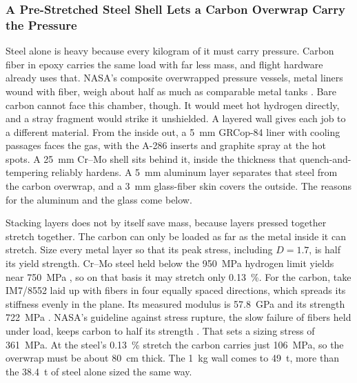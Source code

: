 \documentclass{article}
\begin{document}
\subsubsection{A Pre-Stretched Steel Shell Lets a Carbon Overwrap Carry the Pressure}\label{sec:carbon_overwrap}

Steel alone is heavy because every kilogram of it must carry pressure. Carbon fiber in epoxy carries the same load with far less mass, and flight hardware already uses that. NASA's composite overwrapped pressure vessels, metal liners wound with fiber, weigh about half as much as comparable metal tanks \cite{mclaughlan2011_copv_primer}. Bare carbon cannot face this chamber, though. It would meet hot hydrogen directly, and a stray fragment would strike it unshielded. A layered wall gives each job to a different material. From the inside out, a \SI{5}{\milli\meter} GRCop-84 liner with cooling passages faces the gas, with the A-286 inserts and graphite spray at the hot spots. A \SI{25}{\milli\meter} Cr--Mo shell sits behind it, inside the thickness that quench-and-tempering reliably hardens. A \SI{5}{\milli\meter} aluminum layer separates that steel from the carbon overwrap, and a \SI{3}{\milli\meter} glass-fiber skin covers the outside. The reasons for the aluminum and the glass come below.

Stacking layers does not by itself save mass, because layers pressed together stretch together. The carbon can only be loaded as far as the metal inside it can stretch. Size every metal layer so that its peak stress, including $D=1.7$, is half its yield strength. Cr--Mo steel held below the \SI{950}{\mega\pascal} hydrogen limit yields near \SI{750}{\mega\pascal} \cite{sanmarchi2017_thickwall}, so on that basis it may stretch only \SI{0.13}{\percent}. For the carbon, take IM7/8552 laid up with fibers in four equally spaced directions, which spreads its stiffness evenly in the plane. Its measured modulus is \SI{57.8}{\giga\pascal} and its strength \SI{722}{\mega\pascal} \cite{ncamp2019_im7_8552}. NASA's guideline against stress rupture, the slow failure of fibers held under load, keeps carbon to half its strength \cite{mclaughlan2011_copv_primer}. That sets a sizing stress of \SI{361}{\mega\pascal}. At the steel's \SI{0.13}{\percent} stretch the carbon carries just \SI{106}{\mega\pascal}, so the overwrap must be about \SI{80}{\centi\meter} thick. The \SI{1}{\kilogram} wall comes to \SI{49}{\tonne}, more than the \SI{38.4}{\tonne} of steel alone sized the same way.
\end{document}

